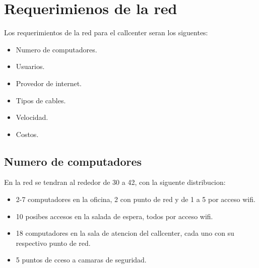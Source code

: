 \documentclass[12pt]{article}
\begin{document}
\pagebreak
\section{\textbf{Requerimienos de la red}}
Los requerimientos de la red para el callcenter seran los siguentes:
\begin{itemize}
\item
Numero de computadores.
\item
Usuarios.
\item
Provedor de internet.
\item
Tipos de cables.
\item
Velocidad.
\item
Costos.
\end{itemize}

\subsection{\textbf{Numero de computadores}}
En la red se tendran al rededor de 30 a 42, con la siguente distribucion:
\begin{itemize}
\item
2-7 computadores en la oficina, 2 con punto de red y de 1 a 5 por acceso wifi.
\item
10 posibes accesos en la salada de espera, todos por acceso wifi.
\item
18 computadores en la sala de atencion del callcenter, cada uno con su respectivo punto de red.
\item
5 puntos de cceso a camaras de seguridad.
\end{itemize}

\end{document}
